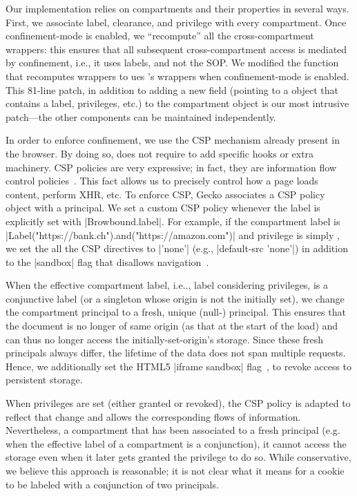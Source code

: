 Our implementation relies on compartments and their properties in
several ways.
%
First, we associate label, clearance, and privilege with every 
compartment.
%
Once confinement-mode is enabled, we ``recompute'' all the
cross-compartment wrappers: this ensures that all subsequent
cross-compartment access is mediated by confinement, i.e., it uses
labels, and not the SOP. %
%
We modified the function that recomputes wrappers to ues \sys{}'s
wrappers when confinement-mode is enabled.
%
This 81-line patch, in addition to adding a new field (pointing to a \sys{}
object that contains a label, privileges, etc.) to the compartment
object is our most intrusive patch---the other \sys{} components can be
maintained independently.
 
%
In order to enforce confinement, we use the CSP mechanism already present 
in the browser. 
By doing so, \sys{} does not require to add specific hooks or extra machinery. 
CSP policies are very expressive; in fact, they are
information flow control policies~\cite{yang:2013:towards}. This fact allows us
to precisely control how a page loads content, perform XHR, etc.
To enforce CSP, Gecko associates a CSP policy object with a principal.
%
We set a custom CSP policy whenever the label is
explicitly set with \js|Browbound.label|.
%
For example, if the compartment label is
\js|Label("https://bank.ch").and("https://amazon.com")| and privilege
is simply , we set the all the CSP directives to
\js|'none'| (e.g., \js|default-src 'none'|) in addition to the
\js|sandbox| flag that disallows
navigation~\cite{csp1.1,whatwg-html,html5}.
%

When the effective compartment label, i.e.., label considering privileges, is
a conjunctive label (or a singleton whose origin is not the initially set), 
we change the compartment principal to a fresh, unique (null-)
principal. 
%
This ensures that the document is no longer of same origin (as that
at the start of the load) and can thus no longer access the
initially-set-origin's storage.
%
Since these fresh principals always differ, the lifetime of the data does not
span multiple requests.
%
Hence, we additionally set the HTML5 \js|iframe sandbox| flag~\cite{html5},
to revoke access to persistent storage.


When privileges are set (either granted or revoked), the CSP policy is adapted
to reflect that change and allows the corresponding flows of
information. Nevertheless, a compartment that has been associated to a fresh
principal (e.g. when the effective label of a compartment is a conjunction), it
cannot access the storage even when it later gets granted the privilege to do
so. While conservative, we believe this approach is reasonable; it is not clear
what it means for a cookie to be labeled with a conjunction of
two principals.

